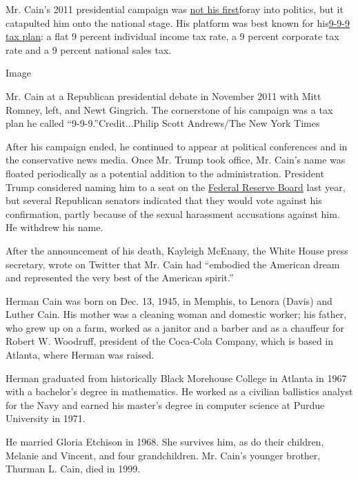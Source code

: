 Mr. Cain's 2011 presidential campaign was
\href{https://www.theatlantic.com/politics/archive/2011/10/herman-cain-for-senate-the-inside-story-of-his-first-insurgent-campaign/246668/}{not
his first}foray into politics, but it catapulted him onto the national
stage. His platform was best known for
his\href{https://www.nytimes3xbfgragh.onion/2011/10/13/us/politics/herman-cains-tax-plan-changes-gop-primary-math.html}{9-9-9
tax plan}: a flat 9 percent individual income tax rate, a 9 percent
corporate tax rate and a 9 percent national sales tax.

Image

Mr. Cain at a Republican presidential debate in November 2011 with Mitt
Romney, left, and Newt Gingrich. The cornerstone of his campaign was a
tax plan he called ``9-9-9.''Credit...Philip Scott Andrews/The New York
Times

After his campaign ended, he continued to appear at political
conferences and in the conservative news media. Once Mr. Trump took
office, Mr. Cain's name was floated periodically as a potential addition
to the administration. President Trump considered naming him to a seat
on the
\href{https://www.nytimes3xbfgragh.onion/2019/04/22/us/politics/trump-herman-cain-federal-reserve.html}{Federal
Reserve Board} last year, but several Republican senators indicated that
they would vote against his confirmation, partly because of the sexual
harassment accusations against him. He withdrew his name.

After the announcement of his death, Kayleigh McEnany, the White House
press secretary, wrote on Twitter that Mr. Cain had ``embodied the
American dream and represented the very best of the American spirit.''

Herman Cain was born on Dec. 13, 1945, in Memphis, to Lenora (Davis) and
Luther Cain. His mother was a cleaning woman and domestic worker; his
father, who grew up on a farm, worked as a janitor and a barber and as a
chauffeur for Robert W. Woodruff, president of the Coca-Cola Company,
which is based in Atlanta, where Herman was raised.

Herman graduated from historically Black Morehouse College in Atlanta in
1967 with a bachelor's degree in mathematics. He worked as a civilian
ballistics analyst for the Navy and earned his master's degree in
computer science at Purdue University in 1971.

He married Gloria Etchison in 1968. She survives him, as do their
children, Melanie and Vincent, and four grandchildren. Mr. Cain's
younger brother, Thurman L. Cain, died in 1999.

